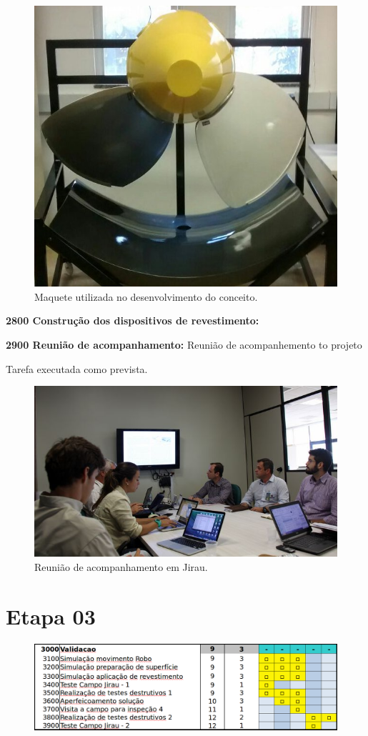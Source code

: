 \begin{figure}[h!]
\centering
\includegraphics[width=0.6\columnwidth]{figs/maquete}
\caption{Maquete utilizada no desenvolvimento do conceito.}
\end{figure} 

  
\noindent
\textbf{2800 Construção dos dispositivos de revestimento:} %

\noindent
\textbf{2900 Reunião de acompanhamento:} Reunião de acompanhemento to projeto

Tarefa executada como prevista. 

\begin{figure}\centering
\includegraphics[width=0.6\columnwidth]{figs/img_4836}
\caption{Reunião de acompanhamento em Jirau.}
\end{figure} 

\section{Etapa 03} 

\begin{figure}[H]
\centering
\includegraphics[width=0.9\columnwidth]{figs/etapa3_completo}
\end{figure} 

